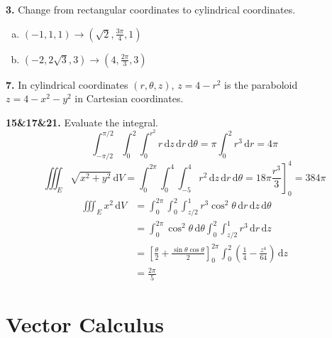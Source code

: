 \documentclass[a4paper,12pt]{article}
\newcommand{\ud}{\,\mathrm{d}}
\newcommand{\exercise}[1]{\noindent\textbf{#1.}}
\begin{document}
\exercise{3} Change from rectangular coordinates to cylindrical coordinates.
\begin{enumerate}[(a)]
  \item $\left(-1, 1, 1\right)
    \rightarrow \left(\sqrt 2, \frac{3\pi}{4}, 1\right)$
  \item $\left(-2, 2\sqrt 3, 3\right)
    \rightarrow \left(4, \frac{2\pi}{3}, 3\right)$
\end{enumerate}

\exercise{7} In cylindrical coordinates $(r, \theta, z)$, $z = 4 - r^2$
is the paraboloid $z = 4 - x^2 - y^2$ in Cartesian coordinates.

\exercise{15\&17\&21} Evaluate the integral.
\[\int_{-\pi/2}^{\pi/2}\int_0^2\int_0^{r^2}r\ud z\ud r\ud\theta
= \pi\int_0^2 r^3\ud r
= 4\pi\tag{15}\]
\[\iiint_E\sqrt{x^2 + y^2}\ud V
= \int_0^{2\pi}\int_0^4\int_{-5}^4 r^2\ud z\ud r\ud\theta
= 18\pi\left.\frac{r^3}{3}\right]_0^4
= 384\pi\tag{17}\]
\begin{align*}
  \iiint_E x^2\ud V
  &= \int_0^{2\pi}\int_0^2\int_{z/2}^1 r^3\cos^2\theta\ud r\ud z\ud\theta\\
  &= \int_0^{2\pi}\cos^2\theta\ud\theta\int_0^2\int_{z/2}^1 r^3\ud r\ud z\\
  &= \left[\frac{\theta}{2} + \frac{\sin\theta\cos\theta}{2}\right]_0^{2\pi}
     \int_0^2\left(\frac{1}{4} - \frac{z^4}{64}\right)\ud z\\
  &= \frac{2\pi}{5}\tag{21}
\end{align*}

\section{Vector Calculus}
\setcounter{subsection}{1}
\end{document}
